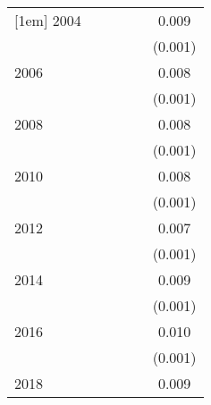 {\begin{tabular}{l*{5}{c}}
[1em]
2004                &                     &                     &                     &                     &       0.009\sym{***}\\
                    &                     &                     &                     &                     &     (0.001)         \\
[1em]
2006                &                     &                     &                     &                     &       0.008\sym{***}\\
                    &                     &                     &                     &                     &     (0.001)         \\
[1em]
2008                &                     &                     &                     &                     &       0.008\sym{***}\\
                    &                     &                     &                     &                     &     (0.001)         \\
[1em]
2010                &                     &                     &                     &                     &       0.008\sym{***}\\
                    &                     &                     &                     &                     &     (0.001)         \\
[1em]
2012                &                     &                     &                     &                     &       0.007\sym{***}\\
                    &                     &                     &                     &                     &     (0.001)         \\
[1em]
2014                &                     &                     &                     &                     &       0.009\sym{***}\\
                    &                     &                     &                     &                     &     (0.001)         \\
[1em]
2016                &                     &                     &                     &                     &       0.010\sym{***}\\
                    &                     &                     &                     &                     &     (0.001)         \\
[1em]
2018                &                     &                     &                     &                     &       0.009\sym{***}\\

\end{tabular}}
